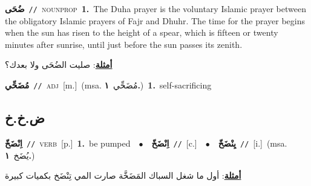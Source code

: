 \documentclass[10pt,a4paper,twoside]{article} %
\begin{document}
\begin{multicols}{2}
{\setlength\topsep{0pt}\textbf{\foreignlanguage{arabic}{ضُحَى}}\ {\color{gray}\texttt{//}\color{black}}\ \textsc{noun\textunderscore prop}\ \textbf{1.}~The Duha prayer is the voluntary Islamic prayer between the obligatory Islamic prayers of Fajr and Dhuhr. The time for the prayer begins when the sun has risen to the height of a spear, which is fifteen or twenty minutes after sunrise, until just before the sun passes its zenith.\  \begin{flushright}\color{gray}\foreignlanguage{arabic}{\textbf{\underline{\foreignlanguage{arabic}{أمثلة}}}: صليت الضُحَى ولا بعدك؟}\end{flushright}\color{black}} \vspace{2mm}

{\setlength\topsep{0pt}\textbf{\foreignlanguage{arabic}{مُضَحِّي}}\ {\color{gray}\texttt{//}\color{black}}\ \textsc{adj}\ [m.]\ \color{gray}(msa. \foreignlanguage{arabic}{مُضَحِّي}~\foreignlanguage{arabic}{\textbf{١.}})\color{black}\ \textbf{1.}~self-sacrificing\ } \vspace{2mm}

\vspace{-3mm}
\subsection*{\color{blue}\foreignlanguage{arabic}{ض.خ.خ}\color{blue}{}} 

{\setlength\topsep{0pt}\textbf{\foreignlanguage{arabic}{اِنْضَخّ}}\ {\color{gray}\texttt{//}\color{black}}\ \textsc{verb}\ [p.]\ \textbf{1.}~be pumped\ \ $\bullet$\ \ \setlength\topsep{0pt}\textbf{\foreignlanguage{arabic}{اِنْضَخّ}}\ {\color{gray}\texttt{//}\color{black}}\ [c.]\ \ $\bullet$\ \ \setlength\topsep{0pt}\textbf{\foreignlanguage{arabic}{يِنْضَخّ}}\ {\color{gray}\texttt{//}\color{black}}\ [i.]\ \color{gray}(msa. \foreignlanguage{arabic}{يُضَخ}~\foreignlanguage{arabic}{\textbf{١.}})\color{black}\  \begin{flushright}\color{gray}\foreignlanguage{arabic}{\textbf{\underline{\foreignlanguage{arabic}{أمثلة}}}: أول ما شغل السباك المَضَخَّة صارت المي تِنْضَخ بكميات كبيرة}\end{flushright}\color{black}} \vspace{2mm}


\end{multicols}
\end{document}
